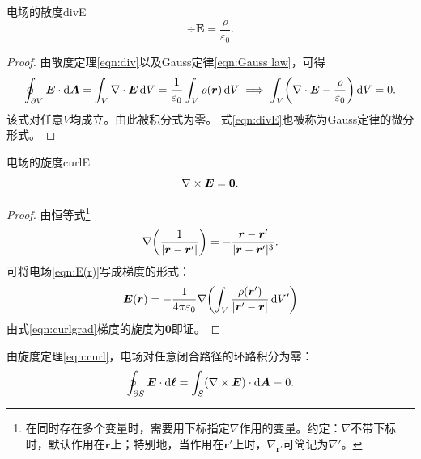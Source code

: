 \begin{theorem}{电场的散度}{divE}
    \begin{equation}
        \label{eqn:divE}
        \div\bm E = \frac\rho{\varepsilon_0}.
    \end{equation}
\end{theorem}

\begin{proof}
    由散度定理\eqref{eqn:div}以及Gauss定律\eqref{eqn:Gauss law}，可得
    \[
        \oint_{\partial V}\bm E \cdot \mathop{}\!\mathrm{d}\bm A = \int_V\nabla\cdot\bm E\mathop{}\!\mathrm{d} V = \frac1{\varepsilon_0}\int_V\rho(\bm r)\mathop{}\!\mathrm{d} V \implies
        \int_V\biggl(\nabla\cdot\bm E - \frac\rho{\varepsilon_0}\biggr)\mathop{}\!\mathrm{d} V = 0.
    \]
    该式对任意$V$均成立。由此被积分式为零。
    式\eqref{eqn:divE}也被称为Gauss定律的微分形式。
\end{proof}

\begin{theorem}
    {电场的旋度}{curlE}
    \begin{equation}
        \label{eqn:curlE}
        \nabla\times\bm E = \bm 0.
    \end{equation}
\end{theorem}

\begin{proof}
    由恒等式\footnote{在同时存在多个变量时，需要用下标指定$\nabla$作用的变量。约定：$\nabla$不带下标时，默认作用在$\bm r$上；特别地，当作用在$\bm r'$上时，$\nabla_{\bm r'}$可简记为$\nabla'$。}
    \begin{equation}
        \label{eq:ed-coulomb-kernel-gradient}
        \nabla\biggl(\frac1{\lvert\bm r - \bm r'\rvert}\biggr) = -\frac{\bm r - \bm r'}{\lvert\bm r - \bm r'\rvert^3}.
    \end{equation}
    可将电场\eqref{eqn:E(r)}写成梯度的形式：
    \begin{equation}
        \label{eqn:E(r)=grad}
        \bm E(\bm r) = -\frac1{4\pi\varepsilon_0}\nabla\biggl(\int_V\frac{\rho(\bm r')}{\lvert\bm r' - \bm r\rvert}\mathop{}\!\mathrm{d} V'\biggr)
    \end{equation}
    由式\eqref{eqn:curlgrad}梯度的旋度为$\bm0$即证。
\end{proof}

\begin{corollary}
    由旋度定理\eqref{eqn:curl}，电场对任意闭合路径的环路积分为零：
    \begin{equation}
        \oint_{\partial S}\bm E \cdot \mathop{}\!\mathrm{d}\bm\ell = \int_S(\nabla\times\bm E) \cdot \mathop{}\!\mathrm{d}\bm A \equiv 0.
    \end{equation}
\end{corollary}

